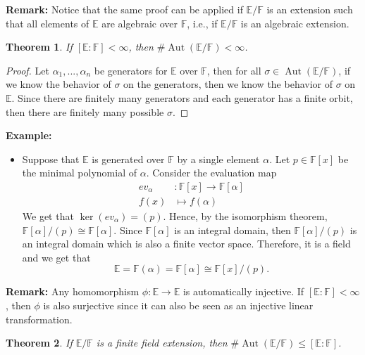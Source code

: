 \documentclass{article}
\newtheorem*{theorem}{Theorem}
\newcommand{\F}{\mathbb{F}}
\newcommand{\E}{\mathbb{E}}
\DeclareMathOperator{\Aut}{\text{Aut}}
\newcommand{\isomorphic}{\cong}
\newenvironment{example}{\noindent\textbf{Example:} \vspace{-0.2cm}\begin{itemize}}{\end{itemize}}
\newenvironment{remark}{\noindent\textbf{Remark:}}{}
\begin{document}
\begin{remark}
    Notice that the same proof can be applied if $\E / \F$ is an extension such that all elements of $\E$ are algebraic over $\F$, i.e., if $\E / \F$ is an algebraic extension.
\end{remark}

\begin{theorem}
    If $[\E : \F] < \infty$, then $\#\Aut(\E / \F) < \infty$.
\end{theorem}

\begin{proof}
    Let $\alpha_1, ..., \alpha_n$ be generators for $\E$ over $\F$, then for all $\sigma \in \Aut(\E / \F)$, if we know the behavior of $\sigma$ on the generators, then we know the behavior of $\sigma$ on $\E$. Since there are finitely many generators and each generator has a finite orbit, then there are finitely many possible $\sigma$.
\end{proof}

\begin{example}
    \item Suppose that $\E$ is generated over $\F$ by a single element $\alpha$. Let $p \in \F[x]$ be the minimal polynomial of $\alpha$. Consider the evaluation map 
    \begin{align*}
        ev_{\alpha} &: \F[x] \to \F[\alpha] \\
        f(x) &\mapsto f(\alpha)
    \end{align*}
    We get that $\ker(ev_{\alpha}) = (p)$. Hence, by the isomorphism theorem, $\F[\alpha]/(p) \isomorphic \F[\alpha]$. Since $\F[\alpha]$ is an integral domain, then $\F[\alpha]/(p)$ is an integral domain which is also a finite vector space. Therefore, it is a field and we get that 
    $$\E = \F(\alpha) = \F[\alpha] \isomorphic \F[x]/(p).$$  
\end{example}

\begin{remark}
    Any homomorphism $\phi : \E \to \E$ is automatically injective. If $[\E : \F] < \infty$, then $\phi$ is also surjective since it can also be seen as an injective linear transformation.
\end{remark}

\begin{theorem}
    If $\E/\F$ is a finite field extension, then $\# \Aut(\E / \F) \leq [\E : \F]$.
\end{theorem}
\end{document}
